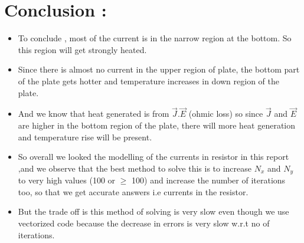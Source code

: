 \documentclass[11pt, a4paper]{article}
\begin{document}
    
  
    
      
  \section{Conclusion :}
  
  \begin{itemize}
  \item
    To conclude , most of the current is in the narrow region at the
    bottom. So this region will get strongly heated.
  \item
    Since there is almost no current in the upper region of plate, the
    bottom part of the plate gets hotter and temperature increases in down
    region of the plate.
  \item
    And we know that heat generated is from \(\vec{J}.\vec{E}\) (ohmic
    loss) so since \(\vec{J}\) and \(\vec{E}\) are higher in the bottom
    region of the plate, there will more heat generation and temperature
    rise will be present.
  \item
    So overall we looked the modelling of the currents in resistor in this
    report ,and we observe that the best method to solve this is to
    increase \(N_x\) and \(N_y\) to very high values (100 or \(\geq\)
    100) and increase the number of iterations too, so that we get accurate
    answers i.e currents in the resistor.
  \item
    But the trade off is this method of solving is very slow even though we
    use vectorized code because the decrease in errors is very slow w.r.t
    no of iterations.
  \end{itemize}
  
\end{document}
